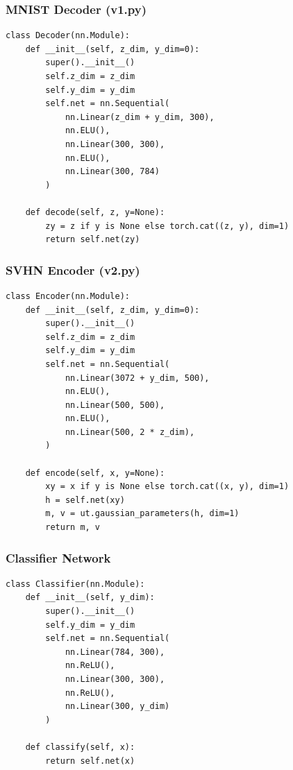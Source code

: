 \documentclass{article}
\begin{document}
\subsubsection{MNIST Decoder (v1.py)}

\begin{verbatim}
class Decoder(nn.Module):
    def __init__(self, z_dim, y_dim=0):
        super().__init__()
        self.z_dim = z_dim
        self.y_dim = y_dim
        self.net = nn.Sequential(
            nn.Linear(z_dim + y_dim, 300),
            nn.ELU(),
            nn.Linear(300, 300),
            nn.ELU(),
            nn.Linear(300, 784)
        )

    def decode(self, z, y=None):
        zy = z if y is None else torch.cat((z, y), dim=1)
        return self.net(zy)
\end{verbatim}

\subsubsection{SVHN Encoder (v2.py)}

\begin{verbatim}
class Encoder(nn.Module):
    def __init__(self, z_dim, y_dim=0):
        super().__init__()
        self.z_dim = z_dim
        self.y_dim = y_dim
        self.net = nn.Sequential(
            nn.Linear(3072 + y_dim, 500),
            nn.ELU(),
            nn.Linear(500, 500),
            nn.ELU(),
            nn.Linear(500, 2 * z_dim),
        )

    def encode(self, x, y=None):
        xy = x if y is None else torch.cat((x, y), dim=1)
        h = self.net(xy)
        m, v = ut.gaussian_parameters(h, dim=1)
        return m, v
\end{verbatim}

\subsubsection{Classifier Network}

\begin{verbatim}
class Classifier(nn.Module):
    def __init__(self, y_dim):
        super().__init__()
        self.y_dim = y_dim
        self.net = nn.Sequential(
            nn.Linear(784, 300),
            nn.ReLU(),
            nn.Linear(300, 300),
            nn.ReLU(),
            nn.Linear(300, y_dim)
        )

    def classify(self, x):
        return self.net(x)
\end{verbatim}
\end{document}
